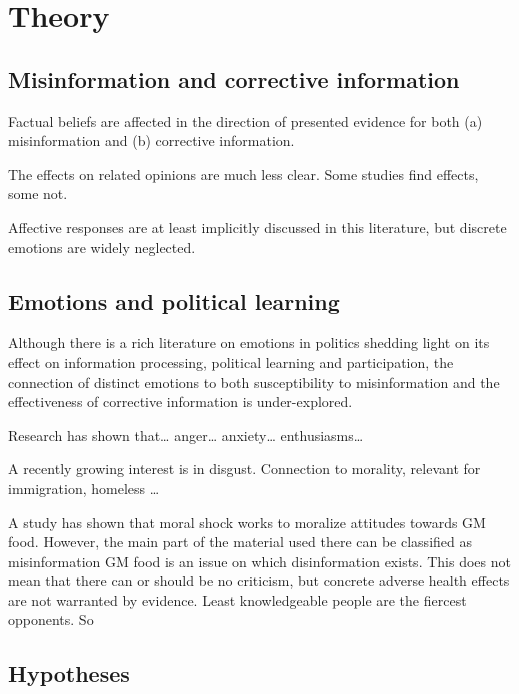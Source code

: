 \documentclass[
  12pt,
]{article}
\begin{document}
\hypertarget{theory}{%
\section{Theory}\label{theory}}

\hypertarget{misinformation-and-corrective-information}{%
\subsection{Misinformation and corrective information}\label{misinformation-and-corrective-information}}

Factual beliefs are affected in the direction of presented evidence for both (a) misinformation and (b) corrective information.

The effects on related opinions are much less clear.
Some studies find effects, some not.

Affective responses are at least implicitly discussed in this literature, but discrete emotions are widely neglected.

\hypertarget{emotions-and-political-learning}{%
\subsection{Emotions and political learning}\label{emotions-and-political-learning}}

Although there is a rich literature on emotions in politics shedding light on its effect on information processing, political learning and participation, the connection of distinct emotions to both susceptibility to misinformation and the effectiveness of corrective information is under-explored.

Research has shown that\ldots{} anger\ldots{} anxiety\ldots{} enthusiasms\ldots{}

A recently growing interest is in disgust.
Connection to morality, relevant for immigration, homeless \ldots{}

A study has shown that moral shock works to moralize attitudes towards GM food.
However, the main part of the material used there can be classified as misinformation
GM food is an issue on which disinformation exists. This does not mean that there can or should be no criticism, but concrete adverse health effects are not warranted by evidence. Least knowledgeable people are the fiercest opponents. So

\hypertarget{hypotheses}{%
\subsection{Hypotheses}\label{hypotheses}}
\end{document}
